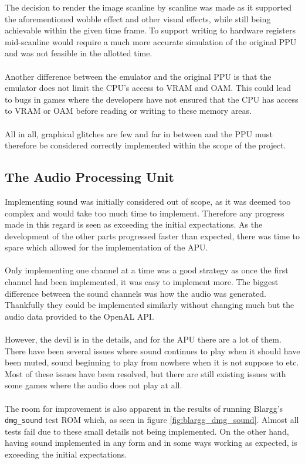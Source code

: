 The decision to render the image scanline by scanline was made as it supported the aforementioned wobble effect and other visual effects, while still being achievable within the given time frame. To support writing to hardware registers mid-scanline would require a much more accurate simulation of the original PPU and was not feasible in the allotted time.\\
\\
Another difference between the emulator and the original PPU is that the emulator does not limit the CPU's access to VRAM and OAM. This could lead to bugs in games where the developers have not ensured that the CPU has access to VRAM or OAM before reading or writing to these memory areas.\\
\\
All in all, graphical glitches are few and far in between and the PPU must therefore be considered correctly implemented within the scope of the project.

\subsection{The Audio Processing Unit}
Implementing sound was initially considered out of scope, as it was deemed too complex and would take too much time to implement. Therefore any progress made in this regard is seen as exceeding the initial expectations. As the development of the other parts progressed faster than expected, there was time to spare which allowed for the implementation of the APU.
\\\\
Only implementing one channel at a time was a good strategy as once the first channel had been implemented, it was easy to implement more. The biggest difference between  the sound channels was how the audio was generated. Thankfully they could be implemented similarly without changing much but the audio data provided to the OpenAL API.
\\\\
However, the devil is in the details, and for the APU there are a lot of them. There have been several issues where sound continues to play when it should have been muted, sound beginning to play from nowhere when it is not suppose to etc. Most of these issues have been resolved, but there are still existing issues with some games where the audio does not play at all.
\\\\
The room for improvement is also apparent in the results of running Blargg's \texttt{dmg\_sound} \cite{Blargg} test ROM which, as seen in figure \ref{fig:blargg_dmg_sound}. Almost all tests fail due to these small details not being implemented. On the other hand, having sound implemented in any form and in some ways working as expected, is exceeding the initial expectations.

